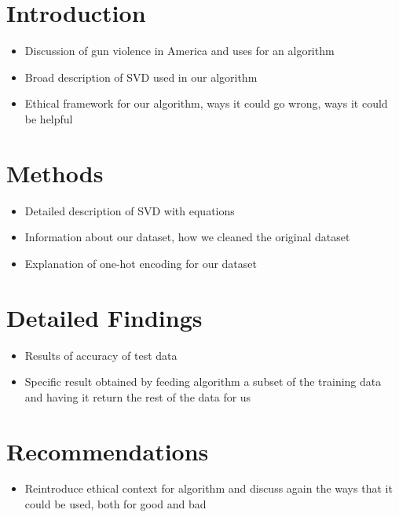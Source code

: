 \documentclass{article}
\begin{document}
\section*{Introduction}
    \begin{itemize}
        \item Discussion of gun violence in America and uses for an algorithm
        \item Broad description of SVD used in our algorithm
        \item Ethical framework for our algorithm, ways it could go wrong, ways it could be helpful
    \end{itemize}
\section*{Methods}
    \begin{itemize}
        \item Detailed description of SVD with equations
        \item Information about our dataset, how we cleaned the original dataset
        \item Explanation of one-hot encoding for our dataset
    \end{itemize}
\section*{Detailed Findings}
    \begin{itemize}
        \item Results of accuracy of test data
        \item Specific result obtained by feeding algorithm a subset of the training data and having it return the rest of the data for us
    \end{itemize}
\section*{Recommendations}
    \begin{itemize}
        \item Reintroduce ethical context for algorithm and discuss again the ways that it could be used, both for good and bad
    \end{itemize}


 
\end{document}
